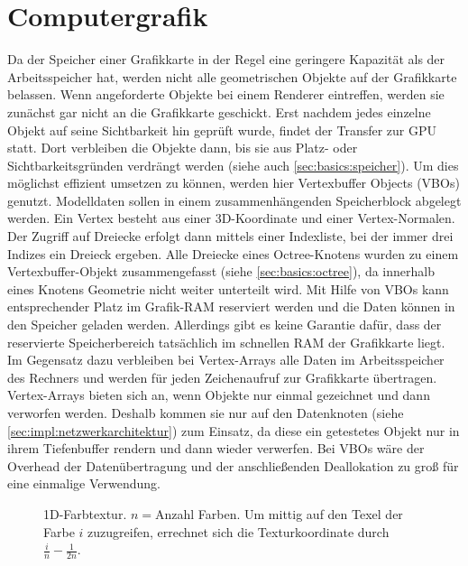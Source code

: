 \section{Computergrafik}
\label{sec:basics:computergrafik}
Da der Speicher einer Grafikkarte in der Regel eine geringere Kapazität als der Arbeitsspeicher hat, werden nicht alle geometrischen Objekte auf der Grafikkarte belassen. Wenn angeforderte Objekte bei einem Renderer eintreffen, werden sie zunächst gar nicht an die Grafikkarte geschickt. Erst nachdem jedes einzelne Objekt auf seine Sichtbarkeit hin geprüft wurde, findet der Transfer zur GPU statt. Dort verbleiben die Objekte dann, bis sie aus Platz- oder Sichtbarkeitsgründen verdrängt werden (siehe auch \ref{sec:basics:speicher}). Um dies möglichst effizient umsetzen zu können, werden hier Vertexbuffer Objects (VBOs) genutzt. Modelldaten sollen in einem zusammenhängenden Speicherblock abgelegt werden. Ein Vertex besteht aus einer 3D-Koordinate und einer Vertex-Normalen. Der Zugriff auf Dreiecke erfolgt dann mittels einer Indexliste, bei der immer drei Indizes ein Dreieck ergeben. Alle Dreiecke eines Octree-Knotens wurden zu einem Vertexbuffer-Objekt zusammengefasst (siehe \ref{sec:basics:octree}), da innerhalb eines Knotens Geometrie nicht weiter unterteilt wird. Mit Hilfe von VBOs kann entsprechender Platz im Grafik-RAM reserviert werden und die Daten können in den Speicher geladen werden. Allerdings gibt es keine Garantie dafür, dass der reservierte Speicherbereich tatsächlich im schnellen RAM der Grafikkarte liegt.\\
Im Gegensatz dazu verbleiben bei Vertex-Arrays alle Daten im Arbeitsspeicher des Rechners und werden für jeden Zeichenaufruf zur Grafikkarte übertragen. Vertex-Arrays bieten sich an, wenn Objekte nur einmal gezeichnet und dann verworfen werden. Deshalb kommen sie nur auf den Datenknoten (siehe \ref{sec:impl:netzwerkarchitektur}) zum Einsatz, da diese ein getestetes Objekt nur in ihrem Tiefenbuffer rendern und dann wieder verwerfen. Bei VBOs wäre der Overhead der Datenübertragung und der anschließenden Deallokation zu groß für eine einmalige Verwendung.
\begin{figure}
  \centering
  
  \caption{1D-Farbtextur. $n=$Anzahl Farben. Um mittig auf den Texel der Farbe $i$ zuzugreifen, errechnet sich die Texturkoordinate durch $\frac{i}{n}-\frac{1}{2n}$. }
  \label{fig:basics:1dtexture}
\end{figure}


